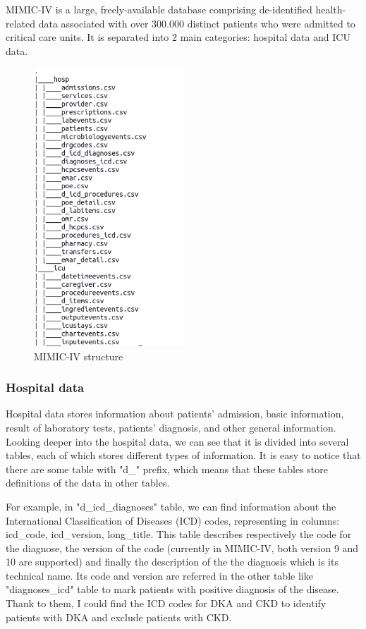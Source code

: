\documentclass[../main.tex]{subfiles}
\begin{document}
MIMIC-IV is a large, freely-available database comprising de-identified health-related data associated with over 300.000 distinct patients who were admitted to critical care units.
It is separated into 2 main categories: hospital data and ICU data.

\begin{figure}[h]
    \centering
    \includegraphics[width=0.5\textwidth]{Figure/MIMIC-IV_tree.png}
    \caption{MIMIC-IV structure}
    \label{fig:mimic-iv-structure}
\end{figure}


\subsubsection{Hospital data}

Hospital data stores information about patients' admission, basic information, result of laboratory tests, patients' diagnosis, and other general information.
Looking deeper into the hospital data, we can see that it is divided into several tables, each of which stores different types of information.
It is easy to notice that there are some table with "d\_" prefix, which means that these tables store definitions of the data in other tables.

For example, in "d\_icd\_diagnoses" table, we can find information about the International Classification of Diseases (ICD) codes, representing in columns: icd\_code, icd\_version, long\_title.
This table describes respectively the code for the diagnose, the version of the code (currently in MIMIC-IV, both version 9 and 10 are supported) and finally the description of the the diagnosis which is its technical name.
Its code and version are referred in the other table like "diagnoses\_icd" table to mark patients with positive diagnosis of the disease.
Thank to them, I could find the ICD codes for DKA and CKD to identify patients with DKA and exclude patients with CKD.
\end{document}
